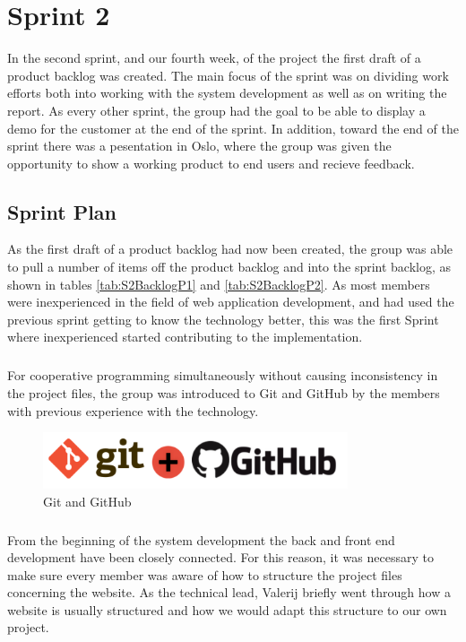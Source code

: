 \chapter{Sprint 2}
\label{chap:S2}
In the second sprint, and our fourth week, of the project the first draft of a product backlog was created. The main focus of the sprint was on dividing work efforts both into working with the system development as well as on writing the report. As every other sprint, the group had the goal to be able to display a demo for the customer at the end of the sprint. In addition, toward the end of the sprint there was a pesentation in Oslo, where the group was given the opportunity to show a working product to end users and recieve feedback.

\section{Sprint Plan}
\label{sec:S2Plan}
As the first draft of a product backlog had now been created, the group was able to pull a number of items off the product backlog and into the sprint backlog, as shown in tables \ref{tab:S2BacklogP1} and \ref{tab:S2BacklogP2}. As most members were inexperienced in the field of web application development, and had used the previous sprint getting to know the technology better, this was the first Sprint where inexperienced started contributing to the implementation. 

\paragraph{}For cooperative programming simultaneously without causing inconsistency in the project files, the group was introduced to Git and GitHub by the members with previous experience with the technology.

\begin{figure}[ht!]
\centering
\includegraphics[width=90mm]{Sprint2/img/Sprint2-GitnGithub.png}
\caption{Git and GitHub \label{fig:S2PlanGit}}
\end{figure}

\paragraph{} From the beginning of the system development the back and front end development have been closely connected. For this reason, it was necessary to make sure every member was aware of how to structure the project files concerning the website. As the technical lead, Valerij briefly went through how a website is usually structured and how we would adapt this structure to our own project. 

